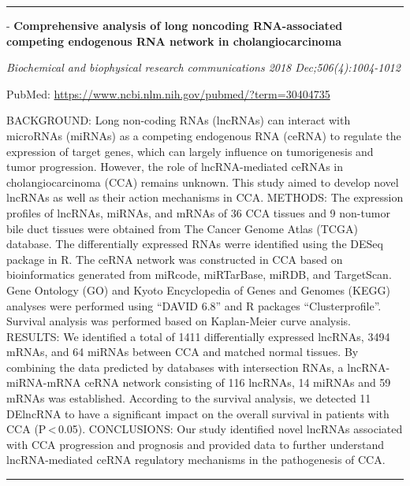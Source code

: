 \documentclass[]{article}
\begin{document}
{}

{}

\begin{center}\rule{0.5\linewidth}{\linethickness}\end{center}

 - \textbf{Comprehensive analysis of long noncoding RNA-associated
competing endogenous RNA network in cholangiocarcinoma}

\emph{Biochemical and biophysical research communications 2018
Dec;506(4):1004-1012}

PubMed: \url{https://www.ncbi.nlm.nih.gov/pubmed/?term=30404735}

BACKGROUND: Long non-coding RNAs (lncRNAs) can interact with microRNAs
(miRNAs) as a competing endogenous RNA (ceRNA) to regulate the
expression of target genes, which can largely influence on tumorigenesis
and tumor progression. However, the role of lncRNA-mediated ceRNAs in
cholangiocarcinoma (CCA) remains unknown. This study aimed to develop
novel lncRNAs as well as their action mechanisms in CCA. METHODS: The
expression profiles of lncRNAs, miRNAs, and mRNAs of 36 CCA tissues and
9 non-tumor bile duct tissues were obtained from The Cancer Genome Atlas
(TCGA) database. The differentially expressed RNAs werre identified
using the DESeq package in R. The ceRNA network was constructed in CCA
based on bioinformatics generated from miRcode, miRTarBase, miRDB, and
TargetScan. Gene Ontology (GO) and Kyoto Encyclopedia of Genes and
Genomes (KEGG) analyses were performed using ``DAVID 6.8'' and R
packages ``Clusterprofile''. Survival analysis was performed based on
Kaplan-Meier curve analysis. RESULTS: We identified a total of 1411
differentially expressed lncRNAs, 3494 mRNAs, and 64 miRNAs between CCA
and matched normal tissues. By combining the data predicted by databases
with intersection RNAs, a lncRNA-miRNA-mRNA ceRNA network consisting of
116 lncRNAs, 14 miRNAs and 59 mRNAs was established. According to the
survival analysis, we detected 11 DElncRNA to have a significant impact
on the overall survival in patients with CCA (P\,\textless{}\,0.05).
CONCLUSIONS: Our study identified novel lncRNAs associated with CCA
progression and prognosis and provided data to further understand
lncRNA-mediated ceRNA regulatory mechanisms in the pathogenesis of CCA.

{}

{}

\begin{center}\rule{0.5\linewidth}{\linethickness}\end{center}
\end{document}
